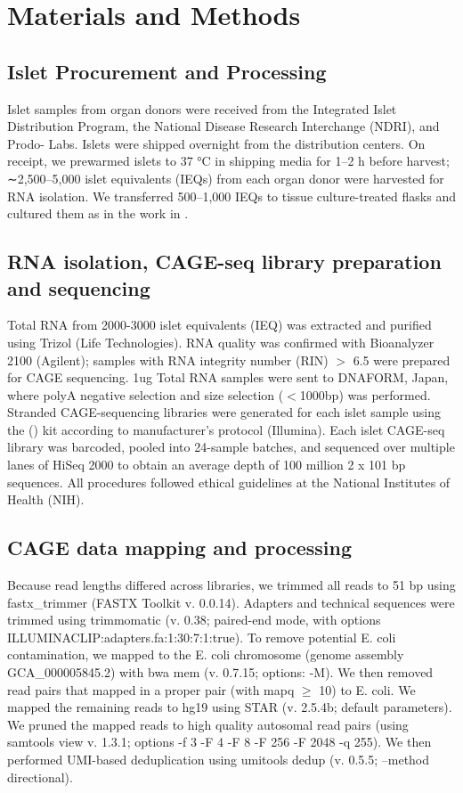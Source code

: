          
\section{Materials and Methods}


\subsection{Islet Procurement and Processing}
Islet samples from organ donors were received from the Integrated Islet Distribution Program, the National Disease Research Interchange (NDRI), and Prodo- Labs. Islets were shipped overnight from the distribution centers. On receipt, we prewarmed islets to 37 °C in shipping media for 1–2 h before harvest; ∼2,500–5,000 islet equivalents (IEQs) from each organ donor were harvested for RNA isolation. We transferred 500–1,000 IEQs to tissue culture-treated flasks and cultured them as in the work in \cite{gershengornEpithelialtoMesenchymalTransitionGenerates2004}.
\subsection{RNA isolation, CAGE-seq library preparation and sequencing}
Total RNA from 2000-3000 islet equivalents (IEQ) was extracted and purified using Trizol (Life Technologies). RNA quality was confirmed with Bioanalyzer 2100 (Agilent); samples with RNA integrity number (RIN) $>$ 6.5 were prepared for CAGE sequencing. 1ug Total RNA samples were sent to DNAFORM, Japan, where polyA negative selection and size selection ($<$1000bp) was performed. Stranded CAGE-sequencing libraries were generated for each islet sample using the () kit according to manufacturer’s protocol (Illumina). Each islet CAGE-seq library was barcoded, pooled into 24-sample batches, and sequenced over multiple lanes of HiSeq 2000 to obtain an average depth of 100 million 2 x 101 bp sequences. All procedures followed ethical guidelines at the National Institutes of Health (NIH).


\subsection{CAGE data mapping and processing}
Because read lengths differed across libraries, we trimmed all reads to 51 bp using fastx\_trimmer (FASTX Toolkit v. 0.0.14). Adapters and technical sequences were trimmed using trimmomatic (v. 0.38; paired-end mode, with options ILLUMINACLIP:adapters.fa:1:30:7:1:true). To remove potential E. coli contamination, we mapped to the E. coli chromosome (genome assembly GCA\_000005845.2) with bwa mem (v. 0.7.15; options: -M). We then removed read pairs that mapped in a proper pair (with mapq $\geq$ 10) to E. coli. We mapped the remaining reads to hg19 using STAR (v. 2.5.4b; default parameters). We pruned the mapped reads to high quality autosomal read pairs (using samtools view v. 1.3.1; options -f 3 -F 4 -F 8 -F 256 -F 2048 -q 255). We then performed UMI-based deduplication using umitools dedup (v. 0.5.5; --method directional).


